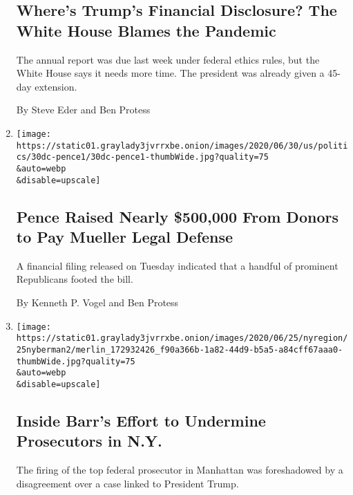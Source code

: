 \begin{enumerate}
  \hypertarget{wheres-trumps-financial-disclosure-the-white-house-blames-the-pandemic}{%
  \subsection{Where's Trump's Financial Disclosure? The White House
  Blames the
  Pandemic}\label{wheres-trumps-financial-disclosure-the-white-house-blames-the-pandemic}}

  The annual report was due last week under federal ethics rules, but
  the White House says it needs more time. The president was already
  given a 45-day extension.

  By Steve Eder and Ben Protess
\item
  \href{/2020/06/30/us/politics/pence-mueller.html}{}

  \texttt{[image: https://static01.graylady3jvrrxbe.onion/images/2020/06/30/us/politics/30dc-pence1/30dc-pence1-thumbWide.jpg?quality=75\\\&auto=webp\\\&disable=upscale]}

  \hypertarget{pence-raised-nearly-500000-from-donors-to-pay-mueller-legal-defense}{%
  \subsection{Pence Raised Nearly \$500,000 From Donors to Pay Mueller
  Legal
  Defense}\label{pence-raised-nearly-500000-from-donors-to-pay-mueller-legal-defense}}

  A financial filing released on Tuesday indicated that a handful of
  prominent Republicans footed the bill.

  By Kenneth P. Vogel and Ben Protess
\item
  \href{/2020/06/25/nyregion/geoffrey-berman-william-barr-michael-cohen.html}{}

  \texttt{[image: https://static01.graylady3jvrrxbe.onion/images/2020/06/25/nyregion/25nyberman2/merlin\_172932426\_f90a366b-1a82-44d9-b5a5-a84cff67aaa0-thumbWide.jpg?quality=75\\\&auto=webp\\\&disable=upscale]}

  \hypertarget{inside-barrs-effort-to-undermine-prosecutors-in-ny}{%
  \subsection{Inside Barr's Effort to Undermine Prosecutors in
  N.Y.}\label{inside-barrs-effort-to-undermine-prosecutors-in-ny}}

  The firing of the top federal prosecutor in Manhattan was foreshadowed
  by a disagreement over a case linked to President Trump.


\end{enumerate}
